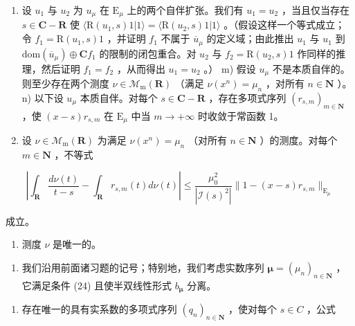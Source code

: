 \begin{enumerate}
\def\labelenumi{\alph{enumi})}
\setcounter{enumi}{11}
\item
  设 \(u_1\) 与 \(u_2\) 为 \(u_\mu\) 在 \(\mathrm{E}_\mu\) 上的两个自伴扩张。我们有 \(u_1 = u_2\) ，当且仅当存在 \(s \in \mathbf{C} - \mathbf{R}\) 使 \(\langle \mathrm{R}(u_1, s)1|1\rangle = \langle \mathrm{R}(u_2, s)1|1\rangle\) 。（假设这样一个等式成立；令 \(f_1 = \mathrm{R}(u_1, s)1\) ，并证明 \(f_1\) 不属于 \(\overline{u}_\mu\) 的定义域；由此推出 \(u_1\) 与 \(u_1\) 到 \(\mathrm{dom}(\overline{u}_\mu) \oplus \mathbf{C}f_1\) 的限制的闭包重合。对 \(u_2\) 与 \(f_2 = \mathrm{R}(u_2, s)1\) 作同样的推理，然后证明 \(f_1 = f_2\) ，从而得出 \(u_1 = u_2\) 。） m) 假设 \(u_\mu\) 不是本质自伴的。则至少存在两个测度 \(\nu \in \mathcal{M}_{\mathrm{m}}(\mathbf{R})\) （满足 \(\nu(x^n) = \mu_n\) ，对所有 \(n \in \mathbf{N}\) ）。 n) 以下设 \(u_\mu\) 本质自伴。对每个 \(s \in \mathbf{C} - \mathbf{R}\) ，存在多项式序列 \((r_{s,m})_{m \in \mathbf{N}}\) ，使 \((x - s)r_{s,m}\) 在 \(\mathrm{E}_\mu\) 中当 \(m \to +\infty\) 时收敛于常函数 1。
\item
  设 \(\nu\in\mathcal{M}_{\mathrm{m}}(\mathbf{R})\) 为满足 \(\nu(x^{n})=\mu_{n}\) （对所有 \(n\in\mathbf{N}\) ）的测度。对每个 \(m\in\mathbf{N}\) ，不等式
\end{enumerate}

\[
\left| \int_ {\mathbf {R}} \frac {d \nu (t)}{t - s} - \int_ {\mathbf {R}} r _ {s, m} (t) d \nu (t) \right| \leqslant \frac {\mu_ {0} ^ {2}}{| \mathcal {I} (s) ^ {2} |} \| 1 - (x - s) r _ {s, m} \| _ {\mathrm{E} _ {\mu}}
\]

成立。

\begin{enumerate}
\def\labelenumi{\alph{enumi})}
\setcounter{enumi}{15}
\tightlist
\item
  测度 \(\nu\) 是唯一的。
\end{enumerate}

\begin{enumerate}
\def\labelenumi{\arabic{enumi})}
\setcounter{enumi}{23}
\tightlist
\item
  我们沿用前面诸习题的记号；特别地，我们考虑实数序列 \(\boldsymbol{\mu} = (\mu_n)_{n\in \mathbf{N}}\) ，它满足条件 (24) 且使半双线性形式 \(b_{\boldsymbol{\mu}}\) 分离。
\end{enumerate}

\begin{enumerate}
\def\labelenumi{\alph{enumi})}
\tightlist
\item
  存在唯一的具有实系数的多项式序列 \((q_{n})_{n\in\mathbf{N}}\) ，使对每个 \(s\in C\) ，公式
\end{enumerate}

